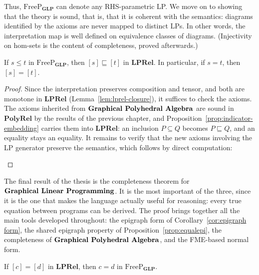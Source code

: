 Thus, $\mathrm{FreeP}_{\mathbf{GLP}}$ can denote any RHS-parametric LP. We move on to showing
that the theory is sound, that is, that it is coherent with the semantics: diagrams
identified by the axioms are never mapped to distinct LPs. In other words, the
interpretation map is well defined on equivalence classes of diagrams.
(Injectivity on hom-sets is the content of completeness, proved afterwards.)

\begin{lemma}[Soundness]
   If $s \le t$ in $\mathrm{FreeP}_{\mathbf{GLP}}$, then
   $[s] \sqsubseteq [t]$ in $\mathbf{LPRel}$. In particular, if $s = t$,
   then $[s] = [t]$.
\end{lemma}

\begin{proof}
    Since the interpretation preserves composition and tensor, and both are
    monotone in $\mathbf{LPRel}$ (Lemma~\ref{lem:lprel-closure}), it suffices
    to check the axioms. The axioms inherited from
    $\text{\bfseries Graphical Polyhedral Algebra}$ are sound in $\mathbf{PolyRel}$
    by the results of the previous chapter, and
    Proposition~\ref{prop:indicator-embedding} carries them into
    $\mathbf{LPRel}$: an inclusion $P\subseteq Q$ becomes $P\sqsubseteq Q$, and
    an equality stays an equality. It remains to verify that the new
    axioms involving the LP generator preserve the semantics, which
    follows by direct computation:
    \begin{figure}[H]
        \centering
        
    \end{figure}
\end{proof}


The final result of the thesis is the completeness theorem for
$\text{\bfseries Graphical Linear Programming}$. 
It is the most important of the three, since it is the one that makes the language
actually useful for reasoning: every true equation between programs can be derived. The proof brings together all the main tools developed
throughout: the epigraph form of Corollary~\ref{cor:epigraph form}, the
shared epigraph property of Proposition~\ref{prop:equalepi}, the
completeness of $\text{\bfseries Graphical Polyhedral Algebra}$, and the FME-based normal form.

\begin{lemma}[Completeness]
   If $[c] = [d]$ in $\mathbf{LPRel}$, then $c = d$ in
   $\mathrm{FreeP}_{\mathbf{GLP}}$.
\end{lemma}

